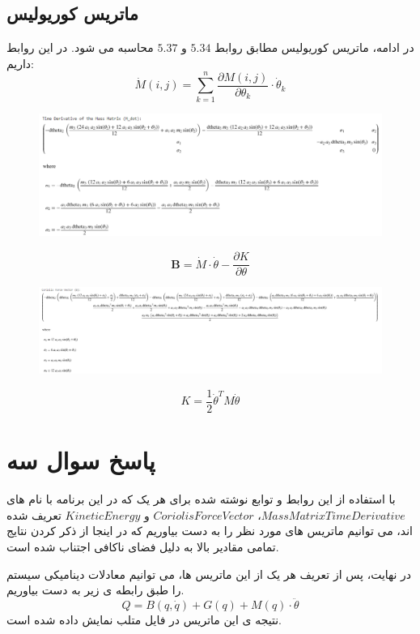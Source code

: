 \subsection*{ماتریس کوریولیس}
در ادامه، ماتریس کوریولیس مطابق روابط $5.34$ و $5.37$ محاسبه می شود. در این روابط داریم:
\[
\dot{M}(i,j) = \sum_{k=1}^{n} \frac{\partial M(i,j)}{\partial \theta_k} \cdot \dot{\theta}_k
\]
\begin{figure}[!h]
	\centering
	\includegraphics[width=1\linewidth]{../img/screenshot002}
	\caption{}
	\label{fig:screenshot002}
\end{figure}
\[
\mathbf{B} = \dot{M} \cdot \dot{\theta} - \frac{\partial K}{\partial \theta}
\]
\begin{figure}[!h]
	\centering
	\includegraphics[width=1\linewidth]{../img/screenshot003}
	\caption{}
	\label{fig:screenshot003}
\end{figure}
\[
K = \frac{1}{2} \dot{\theta}^T M \dot{\theta}
\]
\section*{پاسخ سوال سه}
با استفاده از این روابط و توابع نوشته شده برای هر یک که در این برنامه با نام های $MassMatrixTimeDerivative$،
$CoriolisForceVector$
و 
$KineticEnergy$
تعریف شده اند، می توانیم ماتریس های مورد نظر را به دست بیاوریم که در اینجا از ذکر کردن نتایج تمامی مقادیر بالا به دلیل فضای ناکافی اجتناب شده است.

در نهایت، پس از تعریف هر یک از این ماتریس ها، می توانیم معادلات دینامیکی سیستم را طبق رابطه ی زیر به دست بیاوریم.
\[
Q = B(q, \dot{q}) + G(q) + M(q) \cdot \ddot{\theta}
\]
نتیجه ی این ماتریس در فایل متلب نمایش داده شده است.
